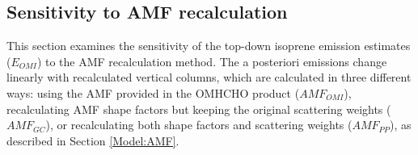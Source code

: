 \documentclass[acp, manuscript]{copernicus}
\newcommand{\parencite}{\citep}
\newcommand{\apost}{E_{OMI}} %
\newcommand{\degr}{$^{\circ}$}
\begin{document}

    

    \subsection{Sensitivity to AMF recalculation}
      \label{BioIsop:uncertainty:recalc}
      
      This section examines the sensitivity of the top-down isoprene emission estimates ($\apost$) to the AMF recalculation method.
      The a posteriori emissions change linearly with recalculated vertical columns, which are calculated in three different ways: using the AMF provided in the OMHCHO product ($AMF_{OMI}$), recalculating AMF shape factors but keeping the original scattering weights ($AMF_{GC}$), or recalculating both shape factors and scattering weights ($AMF_{PP}$), as described in Section \ref{Model:AMF}.
      
\end{document}
